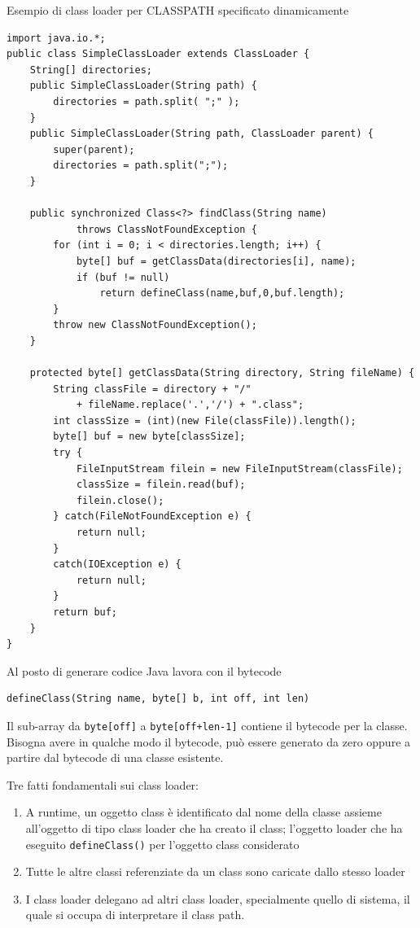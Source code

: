 Esempio di class loader per CLASSPATH specificato dinamicamente
\begin{verbatim}
import java.io.*;
public class SimpleClassLoader extends ClassLoader {
    String[] directories;
    public SimpleClassLoader(String path) {
        directories = path.split( ";" );
    }
    public SimpleClassLoader(String path, ClassLoader parent) {
        super(parent);
        directories = path.split(";");
    }

    public synchronized Class<?> findClass(String name)
            throws ClassNotFoundException {
        for (int i = 0; i < directories.length; i++) {
            byte[] buf = getClassData(directories[i], name);
            if (buf != null)
                return defineClass(name,buf,0,buf.length);
        }
        throw new ClassNotFoundException();
    }

    protected byte[] getClassData(String directory, String fileName) {
        String classFile = directory + "/"
            + fileName.replace('.','/') + ".class";
        int classSize = (int)(new File(classFile)).length();
        byte[] buf = new byte[classSize];
        try {
            FileInputStream filein = new FileInputStream(classFile);
            classSize = filein.read(buf);
            filein.close();
        } catch(FileNotFoundException e) {
            return null;
        }
        catch(IOException e) {
            return null;
        }
        return buf;
    }
}
\end{verbatim}

Al posto di generare codice Java lavora con il bytecode
\begin{verbatim}
defineClass(String name, byte[] b, int off, int len)
\end{verbatim}

Il sub-array da \texttt{byte[off]} a \texttt{byte[off+len-1]} contiene il bytecode per la classe. Bisogna avere in qualche modo il bytecode, può essere generato da zero oppure a partire dal bytecode di una classe esistente.

Tre fatti fondamentali sui class loader:
\begin{enumerate}
    \item A runtime, un oggetto class è identificato dal nome della classe assieme all'oggetto di tipo class loader che ha creato il class; l'oggetto loader che ha eseguito \texttt{defineClass()} per l'oggetto class considerato

    \item Tutte le altre classi referenziate da un class sono caricate dallo stesso loader

    \item I class loader delegano ad altri class loader, specialmente quello di sistema, il quale si occupa di interpretare il class path.
\end{enumerate}

